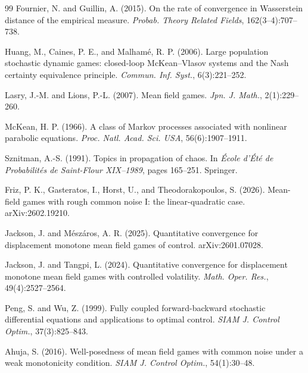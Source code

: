 \documentclass[11pt]{article}
\theoremstyle{remark}
\begin{document}
\begin{thebibliography}{99}
Fournier, N. and Guillin, A. (2015).
\newblock On the rate of convergence in Wasserstein distance of the empirical
measure.
\newblock \emph{Probab. Theory Related Fields}, 162(3--4):707--738.

Huang, M., Caines, P. E., and Malham\'e, R. P. (2006).
\newblock Large population stochastic dynamic games: closed-loop McKean--Vlasov
systems and the Nash certainty equivalence principle.
\newblock \emph{Commun. Inf. Syst.}, 6(3):221--252.

Lasry, J.-M. and Lions, P.-L. (2007).
\newblock Mean field games.
\newblock \emph{Jpn. J. Math.}, 2(1):229--260.

McKean, H. P. (1966).
\newblock A class of Markov processes associated with nonlinear parabolic
equations.
\newblock \emph{Proc. Natl. Acad. Sci. USA}, 56(6):1907--1911.

Sznitman, A.-S. (1991).
\newblock Topics in propagation of chaos.
\newblock In \emph{\'Ecole d'\'Et\'e de Probabilit\'es de Saint-Flour XIX--1989},
pages 165--251. Springer.

Friz, P. K., Gasteratos, I., Horst, U., and Theodorakopoulos, S. (2026).
\newblock Mean-field games with rough common noise I: the linear-quadratic case.
\newblock arXiv:2602.19210.

Jackson, J. and Mészáros, A. R. (2025).
\newblock Quantitative convergence for displacement monotone mean field games of
control.
\newblock arXiv:2601.07028.

Jackson, J. and Tangpi, L. (2024).
\newblock Quantitative convergence for displacement monotone mean field games with
controlled volatility.
\newblock \emph{Math. Oper. Res.}, 49(4):2527--2564.

Peng, S. and Wu, Z. (1999).
\newblock Fully coupled forward-backward stochastic differential equations and
applications to optimal control.
\newblock \emph{SIAM J. Control Optim.}, 37(3):825--843.

Ahuja, S. (2016).
\newblock Well-posedness of mean field games with common noise under a weak
monotonicity condition.
\newblock \emph{SIAM J. Control Optim.}, 54(1):30--48.


\end{thebibliography}
\end{document}

